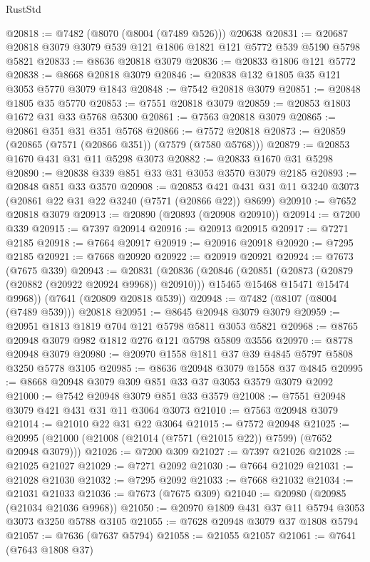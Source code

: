 \begin{lexlean}{RustStd}
\begin{coremodule}
{\begin{coremodule}
{{{{{{{{{{{{{{{{{{{{{{{{{{{{{{{{@20818 := @7482 (@8070 (@8004 (@7489 @526))) @20638
@20831 := @20687 @20818 @3079 @3079 @539 @121 @1806 @1821 @121 @5772 @539 @5190 @5798 @5821
@20833 := @8636 @20818 @3079
@20836 := @20833 @1806 @121 @5772
@20838 := @8668 @20818 @3079
@20846 := @20838 @132 @1805 @35 @121 @3053 @5770 @3079 @1843
@20848 := @7542 @20818 @3079
@20851 := @20848 @1805 @35 @5770
@20853 := @7551 @20818 @3079
@20859 := @20853 @1803 @1672 @31 @33 @5768 @5300
@20861 := @7563 @20818 @3079
@20865 := @20861 @351 @31 @351 @5768
@20866 := @7572 @20818
@20873 := @20859 (@20865 (@7571 (@20866 @351)) (@7579 (@7580 @5768)))
@20879 := @20853 @1670 @431 @31 @11 @5298 @3073
@20882 := @20833 @1670 @31 @5298
@20890 := @20838 @339 @851 @33 @31 @3053 @3570 @3079 @2185
@20893 := @20848 @851 @33 @3570
@20908 := @20853 @421 @431 @31 @11 @3240 @3073 (@20861 @22 @31 @22 @3240 (@7571 (@20866 @22)) @8699)
@20910 := @7652 @20818 @3079
@20913 := @20890 (@20893 (@20908 @20910))
@20914 := @7200 @339
@20915 := @7397 @20914
@20916 := @20913 @20915
@20917 := @7271 @2185
@20918 := @7664 @20917
@20919 := @20916 @20918
@20920 := @7295 @2185
@20921 := @7668 @20920
@20922 := @20919 @20921
@20924 := @7673 (@7675 @339)
@20943 := @20831
    (@20836
      (@20846
        (@20851 (@20873 (@20879 (@20882 (@20922 @20924 @9968)) @20910)))
        @15465
        @15468
        @15471
        @15474
        @9968))
    (@7641 (@20809 @20818 @539))
@20948 := @7482 (@8107 (@8004 (@7489 @539))) @20818
@20951 := @8645 @20948 @3079 @3079
@20959 := @20951 @1813 @1819 @704 @121 @5798 @5811 @3053 @5821
@20968 := @8765 @20948 @3079 @982 @1812 @276 @121 @5798 @5809 @3556
@20970 := @8778 @20948 @3079
@20980 := @20970 @1558 @1811 @37 @39 @4845 @5797 @5808 @3250 @5778 @3105
@20985 := @8636 @20948 @3079 @1558 @37 @4845
@20995 := @8668 @20948 @3079 @309 @851 @33 @37 @3053 @3579 @3079 @2092
@21000 := @7542 @20948 @3079 @851 @33 @3579
@21008 := @7551 @20948 @3079 @421 @431 @31 @11 @3064 @3073
@21010 := @7563 @20948 @3079
@21014 := @21010 @22 @31 @22 @3064
@21015 := @7572 @20948
@21025 := @20995 (@21000 (@21008 (@21014 (@7571 (@21015 @22)) @7599) (@7652 @20948 @3079)))
@21026 := @7200 @309
@21027 := @7397 @21026
@21028 := @21025 @21027
@21029 := @7271 @2092
@21030 := @7664 @21029
@21031 := @21028 @21030
@21032 := @7295 @2092
@21033 := @7668 @21032
@21034 := @21031 @21033
@21036 := @7673 (@7675 @309)
@21040 := @20980 (@20985 (@21034 @21036 @9968))
@21050 := @20970 @1809 @431 @37 @11 @5794 @3053 @3073 @3250 @5788 @3105
@21055 := @7628 @20948 @3079 @37 @1808 @5794
@21057 := @7636 (@7637 @5794)
@21058 := @21055 @21057
@21061 := @7641 (@7643 @1808 @37)
}}}}}}}}}}}}}}}}}}}}}}}}}}}}}}}}
\end{coremodule}}
\end{coremodule}
\end{lexlean}
